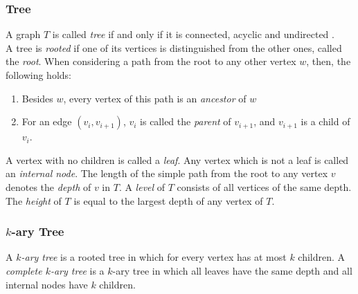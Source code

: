 \subsubsection{Tree}
A graph $T$ is called \emph{tree} if and only if it is connected, acyclic and undirected \cite[P. 1172]{DBLP:cormen_intro_to_algorithms}.\\
A tree is \emph{rooted} if one of its vertices is distinguished from the other ones, called the \emph{root}.
When considering a path from the root to any other vertex $w$, then, the following holds:
\begin{enumerate}
	\item Besides $w$, every vertex of this path is an \emph{ancestor} of $w$
	\item For an edge $(v_i,v_{i+1})$, $v_i$ is called the \emph{parent} of $v_{i+1}$, and $v_{i+1}$ is a child of $v_i$.
\end{enumerate}
A vertex with no children is called a \emph{leaf}. Any vertex which is not a leaf is called an \emph{internal node}.
The length of the simple path from the root to any vertex $v$ denotes the \emph{depth} of $v$ in $T$.
A \emph{level} of $T$ consists of all vertices of the same depth.
The \emph{height} of $T$ is equal to the largest depth of any vertex of $T$. \cite[P. 1176ff]{DBLP:cormen_intro_to_algorithms}
\subsubsection{$k$-ary Tree}
A \emph{$k$-ary tree} is a rooted tree in which for every vertex has at most $k$ children.
A \emph{complete $k$-ary tree} is a $k$-ary tree in which all leaves have the same depth and all internal nodes have $k$ children.
